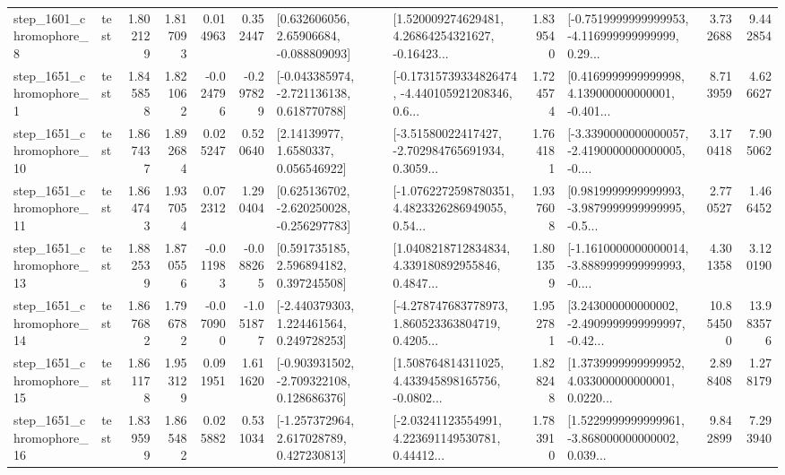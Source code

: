 \begin{tabular}{llrrrrllrlrr}
  step\_1601\_chromophore\_8 &      test &      1.802129 &    1.817093 &      0.014963 &  0.352447 &     [0.632606056, 2.65906684, -0.088809093] &  [1.520009274629481, 4.26864254321627, -0.16423... &       1.839540 &  [-0.7519999999999953, -4.116999999999999, 0.29... &            3.732688 &          9.442854 \\
  step\_1651\_chromophore\_1 &      test &      1.845858 &    1.821062 &     -0.024796 & -0.297829 &   [-0.043385974, -2.721136138, 0.618770788] &  [-0.17315739334826474, -4.440105921208346, 0.6... &       1.724574 &  [0.4169999999999998, 4.139000000000001, -0.401... &            8.713959 &          4.626627 \\
 step\_1651\_chromophore\_10 &      test &      1.867437 &    1.892684 &      0.025247 &  0.520640 &        [2.14139977, 1.6580337, 0.056546922] &  [-3.51580022417427, -2.702984765691934, 0.3059... &       1.764181 &  [-3.3390000000000057, -2.4190000000000005, -0.... &            3.170418 &          7.905062 \\
 step\_1651\_chromophore\_11 &      test &      1.864743 &    1.937054 &      0.072312 &  1.290404 &   [0.625136702, -2.620250028, -0.256297783] &  [-1.0762272598780351, 4.4823326286949055, 0.54... &       1.937608 &  [0.9819999999999993, -3.9879999999999995, -0.5... &            2.770527 &          1.466452 \\
 step\_1651\_chromophore\_13 &      test &      1.882539 &    1.870556 &     -0.011983 & -0.088265 &     [0.591735185, 2.596894182, 0.397245508] &  [1.0408218712834834, 4.339180892955846, 0.4847... &       1.801359 &  [-1.1610000000000014, -3.8889999999999993, -0.... &            4.301358 &          3.120190 \\
 step\_1651\_chromophore\_14 &      test &      1.867682 &    1.796782 &     -0.070900 & -1.051877 &    [-2.440379303, 1.224461564, 0.249728253] &  [-4.278747683778973, 1.860523363804719, 0.4205... &       1.952781 &  [3.243000000000002, -2.4909999999999997, -0.42... &           10.854500 &         13.983576 \\
 step\_1651\_chromophore\_15 &      test &      1.861178 &    1.953129 &      0.091951 &  1.611620 &   [-0.903931502, -2.709322108, 0.128686376] &  [1.508764814311025, 4.433945898165756, -0.0802... &       1.828248 &  [1.3739999999999952, 4.033000000000001, 0.0220... &            2.898408 &          1.278179 \\
 step\_1651\_chromophore\_16 &      test &      1.839599 &    1.865482 &      0.025882 &  0.531034 &    [-1.257372964, 2.617028789, 0.427230813] &  [-2.03241123554991, 4.223691149530781, 0.44412... &       1.783910 &  [1.5229999999999961, -3.868000000000002, 0.039... &            9.842899 &          7.293940 \\

\end{tabular}
